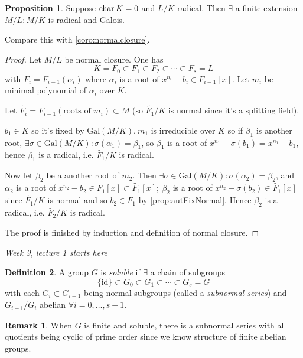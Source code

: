 \documentclass[a4paper]{article}
\newcommand{\gal}{\text{Gal}}
\newcommand{\Char}{\text{char\,}}
\newcommand{\id}{\text{id}}
\theoremstyle{definition}
\newtheorem{defn}{Definition}[subsection]
\newtheorem{prop}[defn]{Proposition}
\newtheorem*{remark}{Remark}
\begin{document}
\begin{prop}
Suppose $\Char K=0$ and $L/K$ radical. Then $\exists$ a finite extension $M/L:M/K$ is radical and Galois.

Compare this with \ref{coro:normalclosure}.
\end{prop}
\begin{proof}
Let $M/L$ be normal closure. One has
\[
K=F_0\subset F_1\subset F_2\subset\cdots\subset F_s=L
\]
with $F_i=F_{i-1}(\alpha_i)$ where $\alpha_i$ is a root of $x^{n_i}-b_i\in F_{i-1}[x]$. Let $m_i$ be minimal polynomial of $\alpha_i$ over $K$.

Let $\widetilde{F_i}=F_{i-1}(\text{roots of }m_i)\subset M$ (so $\widetilde{F_1}/K$ is normal since it's a splitting field).

$b_1\in K$ so it's fixed by $\gal(M/K).\ m_1$ is irreducible over $K$ so if $\beta_1$ is another root, $\exists\sigma\in\gal(M/K):\sigma(\alpha_1)=\beta_1$, so $\beta_1$ is a root of $x^{n_1}-\sigma(b_1)=x^{n_1}-b_1$, hence $\beta_1$ is a radical, i.e. $\widetilde{F_1}/K$ is radical.

Now let $\beta_2$ be a another root of $m_2$. Then $\exists\sigma\in\gal(M/K):\sigma(\alpha_2)=\beta_2$, and $\alpha_2$ is a root of $x^{n_2}-b_2\in F_1[x]\subset \widetilde{F_1}[x];\ \beta_2$ is a root of $x^{n_2}-\sigma(b_2)\in\widetilde{F_1}[x]$ since $\widetilde{F_1}/K$ is normal and so $b_2\in\widetilde{F_1}$ by \ref{prop:autFixNormal}. Hence $\beta_2$ is a radical, i.e. $\widetilde{F_2}/K$ is radical.

The proof is finished by induction and definition of normal closure.
\end{proof}

\begin{flushright}
\textit{Week 9, lecture 1 starts here}
\end{flushright}

\begin{defn}
A group $G$ is \textit{soluble} if $\exists$ a chain of subgroups
\[
\{\id\}\subset G_0\subset G_1\subset \cdots \subset G_s=G
\]
with each $G_i\subset G_{i+1}$ being normal subgroups (called a \textit{subnormal series}) and $G_{i+1}/G_i$ abelian $\forall i=0,\ldots,s-1$.
\end{defn}

\begin{remark}
When $G$ is finite and soluble, there is a subnormal series with all quotients being cyclic of prime order since we know structure of finite abelian groups.
\end{remark}
\end{document}
